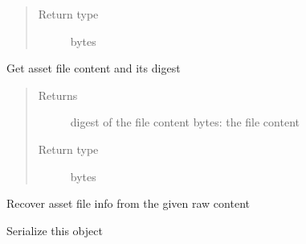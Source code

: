 \documentclass[letterpaper,10pt,english]{sphinxmanual}
\begin{document}
\begin{fulllineitems}
\begin{fulllineitems}
\begin{quote}
\begin{description}
\item[{Return type}] \leavevmode
bytes

\end{description}\end{quote}

\end{fulllineitems}


\begin{fulllineitems}
\label{\detokenize{bbc1.core.bbclib:bbc1.core.bbclib.BBcAsset.get_asset_file}}
Get asset file content and its digest
\begin{quote}\begin{description}
\item[{Returns}] \leavevmode
digest of the file content
bytes: the file content

\item[{Return type}] \leavevmode
bytes

\end{description}\end{quote}

\end{fulllineitems}


\begin{fulllineitems}
\label{\detokenize{bbc1.core.bbclib:bbc1.core.bbclib.BBcAsset.recover_asset_file}}
Recover asset file info from the given raw content

\end{fulllineitems}


\begin{fulllineitems}
\label{\detokenize{bbc1.core.bbclib:bbc1.core.bbclib.BBcAsset.serialize}}
Serialize this object

\end{fulllineitems}


\end{fulllineitems}

\end{document}
